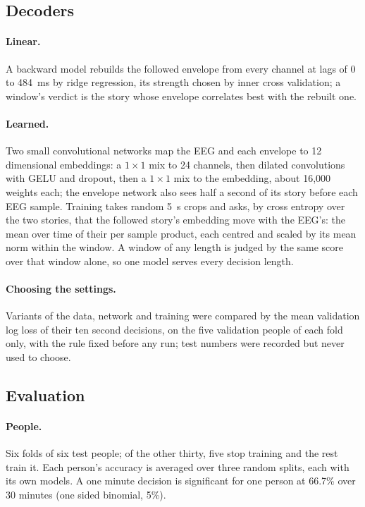 \documentclass[11pt]{article}
\begin{document}
\subsection{Decoders}
\label{sec:decoders}
\paragraph{Linear.} A backward model rebuilds the followed envelope from every channel at lags of 0 to 484~ms by ridge regression, its strength chosen by inner cross validation; a window's verdict is the story whose envelope correlates best with the rebuilt one.
\paragraph{Learned.} Two small convolutional networks map the EEG and each envelope to 12 dimensional embeddings: a $1\times1$ mix to 24 channels, then dilated convolutions with GELU and dropout, then a $1\times1$ mix to the embedding, about 16,000 weights each; the envelope network also sees half a second of its story before each EEG sample. Training takes random 5~s crops and asks, by cross entropy over the two stories, that the followed story's embedding move with the EEG's: the mean over time of their per sample product, each centred and scaled by its mean norm within the window. A window of any length is judged by the same score over that window alone, so one model serves every decision length.
\paragraph{Choosing the settings.} Variants of the data, network and training were compared by the mean validation log loss of their ten second decisions, on the five validation people of each fold only, with the rule fixed before any run; test numbers were recorded but never used to choose.

\subsection{Evaluation}
\paragraph{People.} Six folds of six test people; of the other thirty, five stop training and the rest train it. Each person's accuracy is averaged over three random splits, each with its own models. A one minute decision is significant for one person at 66.7\% over 30 minutes (one sided binomial, 5\%).
\end{document}
